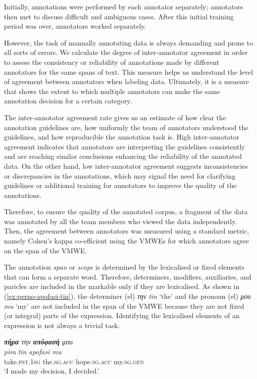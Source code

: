 \documentclass[output=paper,colorlinks,citecolor=brown]{langscibook}
\begin{document}
Initially, annotations were performed by each annotator separately; annotators then met to discuss difficult and ambiguous cases. After this initial training period was over, annotators worked separately.

However, the task of manually annotating data is always demanding and prone to all sorts of errors. We calculate the degree of inter-annotator agreement in order to assess the consistency or reliability of annotations made by different annotators for the same spans of text. This measure helps us understand the level of agreement between annotators when labeling data. 
Ultimately, it is a measure that shows the extent to which multiple annotators can make the same annotation decision for a certain category.


The inter-annotator agreement rate gives us an estimate of how clear the annotation guidelines are, how uniformly the team of annotators understood the guidelines, and how reproducible the annotation task is. High inter-annotator agreement indicates that annotators are interpreting the guidelines consistently and are reaching similar conclusions enhancing the reliability of the annotated data. On the other hand, low inter-annotator agreement suggests inconsistencies or discrepancies in the annotations, which may signal the need for clarifying guidelines or additional training for annotators to improve the quality of the annotations.

Therefore, to ensure the quality of the annotated corpus, a fragment of the data was annotated by all the team members who viewed the data independently. Then, the agreement between annotators was measured using a standard metric, namely Cohen's kappa co-efficient \citep{carletta-1996-assessing, artstein-poesio-2008-survey} using the VMWEs for which annotators agree on the span of the VMWE. 


The annotation \textit{span} or \textit{scope} is determined by the lexicalised or fixed elements that can form a separate word. Therefore, determiners, modifiers, auxiliaries, and paricles are included in the markable only if they are lexicalised. As shown in (\ref{ex:perno-apofasi-tin}), the determiner (el) \textit{την} \textit{tin} `the' and the pronoun (el) \textit{μου} \textit{mu} `my' are not included in the span of the VMWE because they are not fixed (or integral) parts of the expression. Identifying the lexicalised elements of an expression is not always a trivial task.

\ea
\label{ex:perno-apofasi-tin}
\settowidth {}
\glll
\textbf{\em{πήρα}} την \textbf{\em{απόφασή}} μου \\
\textit{pira} \textit{tin} \textit{apofasi} \textit{mu} \\
take.\textsc{pst.1sg} the.\textsc{sg.acc} hope.\textsc{sg.acc} my.\textsc{sg.gen}\\
\glt ‘I made my decision, I decided.’
\z
\end{document}
